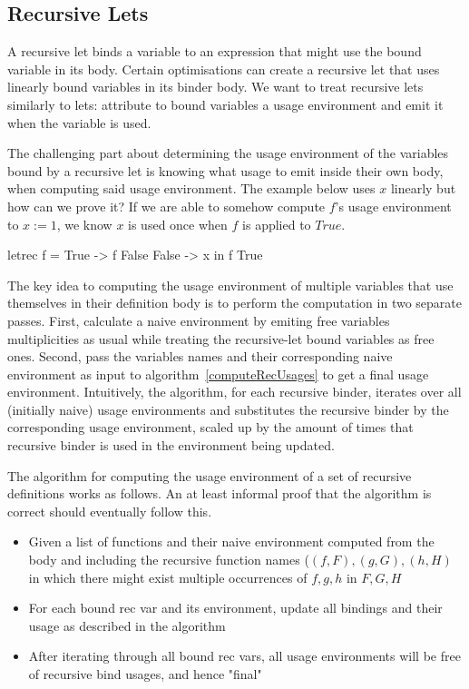 \documentclass[]{lwnovathesis}
\begin{document}
\subsection{Recursive Lets}

A recursive let binds a variable to an expression that might use the bound
variable in its body. Certain optimisations can create a recursive let that uses
linearly bound variables in its binder body. We want to treat recursive lets
similarly to lets: attribute to bound variables a usage environment and emit it
when the variable is used.

The challenging part about determining the usage environment of the variables bound
by a recursive let is knowing what usage to emit inside their own body, when
computing said usage environment. The example below uses $x$ linearly %
but how can we prove it? If we are able to somehow compute $f$'s usage
environment to $x := 1$, we know $x$ is used once when $f$ is applied to
$\mathit{True}$.

\begin{code}
letrec f = \case
        True -> f False
        False -> x
in f True
\end{code}

The key idea to computing the usage environment of multiple variables that use
themselves in their definition body is to perform the computation in two separate passes. First,
calculate a naive environment by emiting free variables multiplicities as usual
while treating the recursive-let bound variables as free ones. Second, pass the
variables names and their corresponding naive environment as input to
algorithm~\ref{computeRecUsages} to get a final usage environment. Intuitively,
the algorithm, for each recursive binder, iterates over all (initially naive) usage
environments and substitutes the recursive binder by the corresponding usage
environment, scaled up by the amount of times that recursive binder is used in
the environment being updated.

The algorithm for computing the usage environment of a set of
recursive definitions works as follows. An at least informal proof
that the algorithm is correct should eventually follow this.

\begin{itemize}
    \item Given a list of functions and their naive environment computed from
        the body and including the recursive function names ($(f, F), (g, G),
        (h, H)$ in which there might exist multiple occurrences of $f, g, h$ in $F, G, H$
    \item For each bound rec var and its environment, update all bindings and
        their usage as described in the algorithm
    \item After iterating through all bound rec vars, all usage environments
        will be free of recursive bind usages, and hence "final"
\end{itemize}
\end{document}
